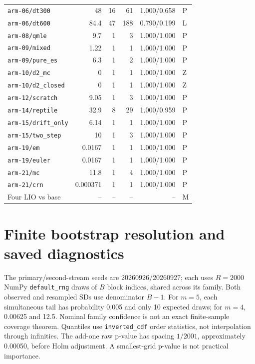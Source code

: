 \begin{longtable}{lrrrrl}
\texttt{arm-06/dt300} & 48 & 16 & 61 & 1.000/0.658 & P\\
\texttt{arm-06/dt600} & 84.4 & 47 & 188 & 0.790/0.199 & L\\
\texttt{arm-08/qmle} & 9.7 & 1 & 3 & 1.000/1.000 & P\\
\texttt{arm-09/mixed} & 1.22 & 1 & 1 & 1.000/1.000 & P\\
\texttt{arm-09/pure\_es} & 6.3 & 1 & 2 & 1.000/1.000 & P\\
\texttt{arm-10/d2\_mc} & 0 & 1 & 1 & 1.000/1.000 & Z\\
\texttt{arm-10/d2\_closed} & 0 & 1 & 1 & 1.000/1.000 & Z\\
\texttt{arm-12/scratch} & 9.05 & 1 & 3 & 1.000/1.000 & P\\
\texttt{arm-14/reptile} & 32.9 & 8 & 29 & 1.000/0.959 & P\\
\texttt{arm-15/drift\_only} & 6.14 & 1 & 1 & 1.000/1.000 & P\\
\texttt{arm-15/two\_step} & 10 & 1 & 3 & 1.000/1.000 & P\\
\texttt{arm-19/em} & 0.0167 & 1 & 1 & 1.000/1.000 & P\\
\texttt{arm-19/euler} & 0.0167 & 1 & 1 & 1.000/1.000 & P\\
\texttt{arm-21/mc} & 11.8 & 1 & 4 & 1.000/1.000 & P\\
\texttt{arm-21/crn} & 0.000371 & 1 & 1 & 1.000/1.000 & P\\
Four LIO vs base & -- & -- & -- & -- & M\\
\end{longtable}


\section{Finite bootstrap resolution and saved diagnostics}
\label{sec:bootstrap-resolution}\hypertarget{sec:bootstrap-resolution}{}
The primary/second-stream seeds are 20260926/20260927; each uses \(R=2000\)
NumPy \texttt{default\_rng} draws of \(B\) block indices, shared across its
family. Both observed and resampled SDs use denominator \(B-1\).
For \(m=5\), each simultaneous tail has probability 0.005 and only 10
expected draws; for \(m=4\), 0.00625 and 12.5. Nominal family confidence
is not an exact finite-sample coverage theorem. Quantiles use
\texttt{inverted\_cdf} order statistics, not interpolation through infinities.
The add-one raw p-value has spacing \(1/2001\), approximately 0.00050,
before Holm adjustment. A smallest-grid p-value is not practical importance.

